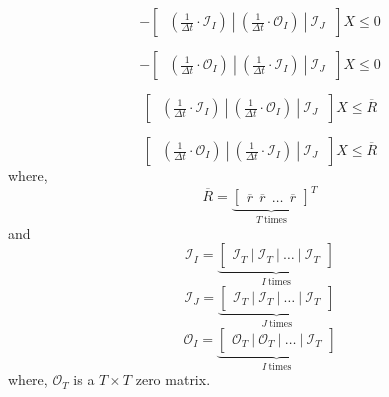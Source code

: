 \begin{equation}
- \begin{bmatrix}
~\left(\frac{1}{\Delta t} \cdot \mathcal{I}_I\right) ~|~ \left(\frac{1}{\Delta t} \cdot \mathcal{O}_I\right)~|~ \mathcal{I}_J~
\end{bmatrix} X \leq 0
\end{equation}

\begin{equation}
-\begin{bmatrix}
~\left(\frac{1}{\Delta t} \cdot \mathcal{O}_I\right) ~|~ \left(\frac{1}{\Delta t} \cdot \mathcal{I}_I\right)~|~\mathcal{I}_J~
\end{bmatrix} X \leq 0
\end{equation}

\begin{equation}
\label{constraint:ESS-capacity}
\begin{bmatrix}
~\left(\frac{1}{\Delta t} \cdot \mathcal{I}_I\right) ~|~ \left(\frac{1}{\Delta t} \cdot \mathcal{O}_I\right)~|~ \mathcal{I}_J~
\end{bmatrix}X \leq \overline{R}
\end{equation}

\begin{equation}
\label{constraint:ESS-capacity-2}
\begin{bmatrix}
~\left(\frac{1}{\Delta t} \cdot \mathcal{O}_I\right) ~|~ \left(\frac{1}{\Delta t} \cdot \mathcal{I}_I\right)~|~\mathcal{I}_J~
\end{bmatrix}X \leq \overline{R}
\end{equation}
where, 
\begin{equation*}
\overline{R} = {\underbrace{\begin{bmatrix}
		\overline{r}~~\overline{r}~~ \dots~~\overline{r}
		\end{bmatrix}}_{T~\text{times}}}^T
\end{equation*}
and
\begin{equation*}
\mathcal{I}_I = {\underbrace{\begin{bmatrix}
		\mathcal{I}_T ~|~\mathcal{I}_T ~|~ \dots~|~\mathcal{I}_T 
		\end{bmatrix}}_{I~\text{times}}}
\end{equation*}
\begin{equation*}
\mathcal{I}_J = {\underbrace{\begin{bmatrix}
		\mathcal{I}_T ~|~\mathcal{I}_T ~|~ \dots~|~\mathcal{I}_T 
		\end{bmatrix}}_{J~\text{times}}}
\end{equation*}
\begin{equation*}
\mathcal{O}_I = {\underbrace{\begin{bmatrix}
		\mathcal{O}_T ~|~\mathcal{O}_T ~|~ \dots~|~\mathcal{I}_T 
		\end{bmatrix}}_{I~\text{times}}}
\end{equation*}
where, $\mathcal{O}_T$ is a $T \times T$ zero matrix.

